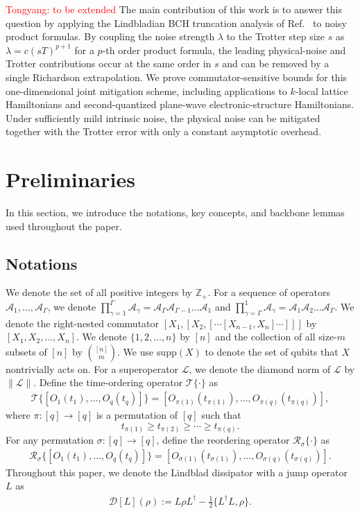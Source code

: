 \documentclass[aps,pra,reprint,groupedaddress,floatfix]{revtex4-2}
\newcommand{\A}{\mathcal{A}}
\newcommand{\supp}{\mathrm{supp}}
\newcommand{\mc}{\mathcal}
\newcommand{\mb}{\mathbb}
\newcommand{\sz}[1]{{\color{blue} Shuo: #1}}
\begin{document}
\textcolor{red}{Tongyang: to be extended}
The main contribution of this work is to answer this question by applying the Lindbladian BCH truncation analysis of Ref.~\cite{wang2026lindbladiansimulationcommutatorbounds} to noisy product formulas. By coupling the noise strength $\lambda$ to the Trotter step size $s$ as $\lambda = c(sT)^{p+1}$ for a $p$-th order product formula, the leading physical-noise and Trotter contributions occur at the same order in $s$ and can be removed by a single Richardson extrapolation. We prove commutator-sensitive bounds for this one-dimensional joint mitigation scheme, including applications to $k$-local lattice Hamiltonians and second-quantized plane-wave electronic-structure Hamiltonians. Under sufficiently mild intrinsic noise, the physical noise can be mitigated together with the Trotter error with only a constant asymptotic overhead.


\section{Preliminaries}
 In this section, we introduce the notations, key concepts, and backbone lemmas used throughout the paper. 


\subsection{Notations}
We denote the set of all positive integers by $\mb{Z}_+$. For a sequence of operators $\A_1, \ldots, \A_{\Gamma}$, we denote $\prod_{\gamma=1}^\Gamma \A_{\gamma}= \A_{\Gamma}\A_{\Gamma-1} \ldots \A_1$ and $\prod_{\gamma=\Gamma}^1 \A_{\gamma}= \A_{1}\A_{2} \ldots \A_\Gamma$. We denote the right-nested commutator $[X_1, [X_2, [\cdots[X_{n-1}, X_n]\cdots]]]$ by $[X_1, X_2, \ldots, X_n]$. We denote $\{1, 2, \ldots, n\}$ by $[n]$ and the collection of all size-$m$ subsets of $[n]$ by $\binom{[n]}{m}$. We use $\supp(X)$ to denote the set of qubits that $X$ nontrivially acts on.  For a superoperator $\mc L$, we denote the diamond norm of $\mc L$ by $\|\mc L\|$.
Define the time-ordering operator $\mc T\{\cdot\}$ as \begin{align*}
    \mc T\big\{[O_1(t_1),\ldots, O_q(t_q) ]\big\}
    =
    [O_{\pi(1)}(t_{\pi(1)}),\ldots, O_{\pi(q)}(t_{\pi(q)})],
\end{align*}
where $\pi\colon [q]\to[q]$ is a permutation of $[q]$ such that \[
    t_{\pi(1)}\ge t_{\pi(2)}\ge \cdots \ge t_{\pi(q)}.
    \]
For any permutation $\sigma\colon [q]\to [q]$, define the reordering operator $\mc R_{\sigma}\{\cdot\}$ as \begin{align*}
    \mc R_{\sigma}\big\{[O_1(t_1),\ldots, O_q(t_q)]\big\}
    =
    [O_{\sigma(1)}(t_{\sigma(1)}),\ldots, O_{\sigma(q)}(t_{\sigma(q)})].
\end{align*}
Throughout this paper, we denote the Lindblad dissipator with a jump operator $L$ as 
\begin{align*}
    \mathcal{D}[L](\rho):= L\rho L^\dagger - \frac{1}{2}\{L^\dagger L, \rho\}.
\end{align*}
\end{document}
